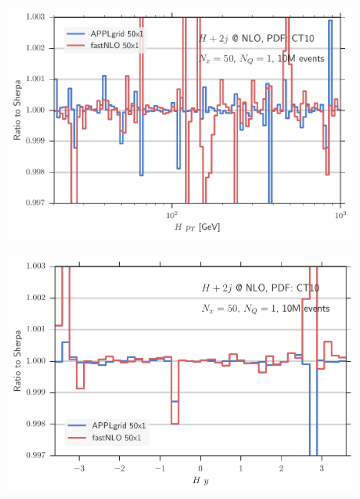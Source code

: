 \begin{figure}
\centering
\begin{subfigure}[]{0.49\textwidth}
	\includegraphics[width=\textwidth]{images/hjjnlo_hpt_50v30.pdf}
\end{subfigure}
\hfill
\begin{subfigure}[]{0.49\textwidth}
	\includegraphics[width=\textwidth]{images/hjjnlo_hy_50v30.pdf}
\end{subfigure}


\end{figure}
